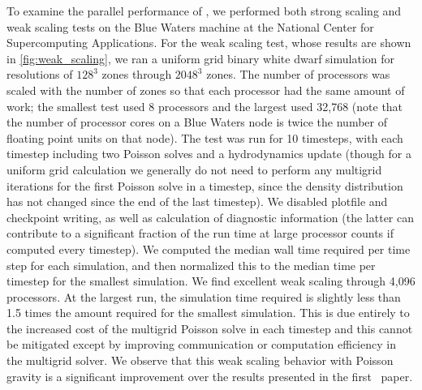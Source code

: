 \documentclass[12pt]{article}
\begin{document}
To examine the parallel performance of \castro, we performed both
strong scaling and weak scaling tests on the Blue Waters machine at
the National Center for Supercomputing Applications. For the weak
scaling test, whose results are shown in \autoref{fig:weak_scaling},
we ran a uniform grid binary white dwarf simulation for resolutions of
$128^3$ zones through $2048^3$ zones. The number of processors was
scaled with the number of zones so that each processor had the same
amount of work; the smallest test used 8 processors and the largest
used 32,768 (note that the number of processor cores on a Blue Waters
node is twice the number of floating point units on that node). The
test was run for 10 timesteps, with each timestep including two
Poisson solves and a hydrodynamics update (though for a uniform grid
calculation we generally do not need to perform any multigrid
iterations for the first Poisson solve in a timestep, since the
density distribution has not changed since the end of the last
timestep). We disabled plotfile and checkpoint writing, as well as
calculation of diagnostic information (the latter can contribute to a
significant fraction of the run time at large processor counts if
computed every timestep). We computed the median wall time required
per time step for each simulation, and then normalized this to the
median time per timestep for the smallest simulation. We find
excellent weak scaling through 4,096 processors. At the largest run,
the simulation time required is slightly less than 1.5 times the amount
required for the smallest simulation.  This is due entirely to the
increased cost of the multigrid Poisson solve in each timestep and
this cannot be mitigated except by improving communication or
computation efficiency in the multigrid solver. We observe that this
weak scaling behavior with Poisson gravity is a significant
improvement over the results presented in the first \castro\ paper.
\end{document}
